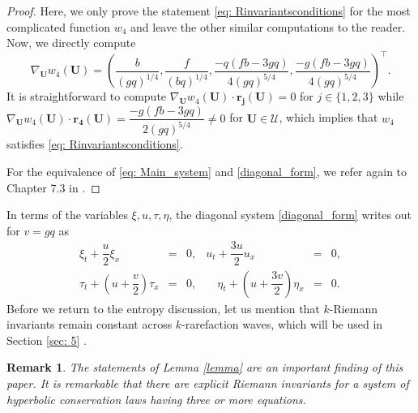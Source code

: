 \documentclass[11pt]{article}
\numberwithin{equation}{section}
\newtheorem{counter example}[theorem]{Counter Example}
\newtheorem{remark}[theorem] {Remark}
\begin{document}
{\begin{proof}
Here, we only prove the statement  \eqref{eq: Rinvariantsconditions} for the most complicated function  $w_4$ and leave the other similar computations to the reader. Now, we directly compute
\[\nabla_{\mathbf{U}}w_4(\mathbf{U})=\left(\dfrac{b}{(gq)^{1/4}}, \dfrac{f}{(bq)^{1/4}}, \dfrac{-q(fb-3gq)}{4(gq)^{5/4}}, \dfrac{-g(fb-3gq)}{4(gq)^{5/4}}\right)^\top.\]
It is straightforward to compute  %
$\nabla_{\mathbf{U}}w_4(\mathbf{U})\cdot\mathbf{r_j}(\mathbf{U})=0$ for $j\in \{1, 2, 3\}$ while $\nabla_{\mathbf{U}}w_4(\mathbf{U})\cdot \mathbf{r_4}(\mathbf{U})=\dfrac{-g(fb-3gq)}{2(gq)^{5/4}}\neq 0$ for $\mathbf{U}\in \mathcal{U}$, which implies that $w_4$ satisfies \eqref{eq: Rinvariantsconditions}. 

For the equivalence of \eqref{eq: Main_system} and \eqref{diagonal_form}, we refer again to Chapter 7.3 in \cite{dafermos2005hyperbolic}.
\end{proof}
In terms of the variables $\xi,u,\tau,\eta$, the diagonal system \eqref{diagonal_form}  writes out for $v=gq$ as 
\begin{equation}\label{Rtransformed}
\begin{array}{rclrcl}
   \xi_t+\dfrac{u}{2} \xi_x&=&0,&  u_t+\dfrac{3 u}{2} u_x&=&0, \\[1.5ex]
   \tau_t+\left(u+\dfrac{v}{2}\right)\tau_x&=&0, &\quad 
\eta_t+\left(u+\dfrac{3v}{2}\right)\eta_x&=&0.
\end{array}    
\end{equation}
Before we return to the entropy discussion,  let us mention that $k$-Riemann invariants remain constant across $k$-rarefaction waves, which will be used in Section \ref{sec: 5} \cite{dafermos2005hyperbolic}. 
\begin{remark}
The statements of Lemma \ref{lemma} are an important finding of this paper. It is remarkable that there are explicit Riemann invariants for a system of hyperbolic conservation laws having three or more equations.   
\end{remark}
}
\end{document}
